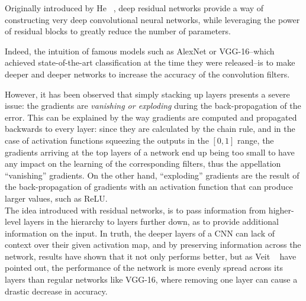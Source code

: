 Originally introduced by He \etal~\cite{He_2016_CVPR}, deep residual networks
provide a way of constructing very deep convolutional neural networks, while
leveraging the power of residual blocks to greatly reduce the number of
parameters.

Indeed, the intuition of famous models such as AlexNet or VGG-16--which
achieved state-of-the-art classification at the time they were released--is to
make deeper and deeper networks to increase the accuracy of the convolution
filters.

However, it has been observed that simply stacking up layers presents a severe
issue: the gradients are \emph{vanishing or exploding} during the
back-propagation of the error. This can be explained by the way gradients are
computed and propagated backwards to every layer: since they are calculated by
the chain rule, and in the case of activation functions squeezing the outputs
in the $[0,1]$ range, the gradients arriving at the top layers of a network end
up being too small to have any impact on the learning of the corresponding
filters, thus the appellation ``vanishing'' gradients. On the other hand,
``exploding'' gradients are the result of the back-propagation of gradients
with an activation function that can produce larger values, such as ReLU.\\

The idea introduced with residual networks, is to pass information from
higher-level layers in the hierarchy to layers further down, as to provide
additional information on the input. In truth, the deeper layers of a CNN can
lack of context over their given activation map, and by preserving information
across the network, results have shown that it not only performs better, but
as Veit \etal~\cite{ResnetBehavior} have pointed out, the performance of the
network is more evenly spread across its layers than regular networks like
VGG-16, where removing one layer can cause a drastic decrease in accuracy.

